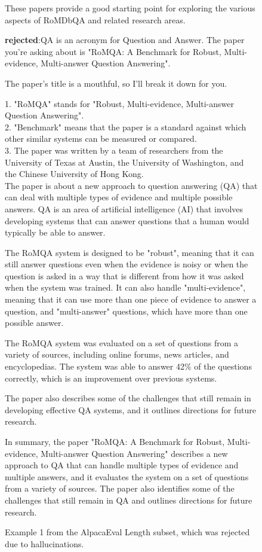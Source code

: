 \begin{figure}[t]
{\begin{minipage}{0.95\linewidth}
These papers provide a good starting point for exploring the various aspects of RoMDbQA and related research areas.

\vspace{1em}

\textbf{rejected}:QA is an acronym for Question and Answer. The paper you're asking about is "RoMQA: A Benchmark for Robust, Multi-evidence, Multi-answer Question Answering".

The paper's title is a mouthful, so I'll break it down for you.

1. "RoMQA" stands for "Robust, Multi-evidence, Multi-answer Question Answering".  \\
2. "Benchmark" means that the paper is a standard against which other similar systems can be measured or compared.  \\
3. The paper was written by a team of researchers from the University of Texas at Austin, the University of Washington, and the Chinese University of Hong Kong.  \\

The paper is about a new approach to question answering (QA) that can deal with multiple types of evidence and multiple possible answers. QA is an area of artificial intelligence (AI) that involves developing systems that can answer questions that a human would typically be able to answer.

The RoMQA system is designed to be "robust", meaning that it can still answer questions even when the evidence is noisy or when the question is asked in a way that is different from how it was asked when the system was trained. It can also handle "multi-evidence", meaning that it can use more than one piece of evidence to answer a question, and "multi-answer" questions, which have more than one possible answer.

The RoMQA system was evaluated on a set of questions from a variety of sources, including online forums, news articles, and encyclopedias. The system was able to answer 42\% of the questions correctly, which is an improvement over previous systems.

The paper also describes some of the challenges that still remain in developing effective QA systems, and it outlines directions for future research.

In summary, the paper "RoMQA: A Benchmark for Robust, Multi-evidence, Multi-answer Question Answering" describes a new approach to QA that can handle multiple types of evidence and multiple answers, and it evaluates the system on a set of questions from a variety of sources. The paper also identifies some of the challenges that still remain in QA and outlines directions for future research.

\end{minipage}
}
\caption{Example 1 from the AlpacaEval Length subset, which was rejected due to hallucinations.}
\label{fig:alpacaeval_4}
\end{figure}
